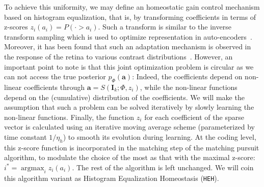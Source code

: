 \documentclass[draft]{article} %
\DeclareMathOperator*{\ArgMax}{\arg\max}   %
\newcommand{\coef}{\mathbf{a}} %
\newcommand{\image}{\mathbf{I}} %
\newcommand{\dico}{\Phi} %
\begin{document}
To achieve this uniformity, we may define an homeostatic gain control mechanism based on histogram equalization, that is, by transforming coefficients in terms of z-scores $z_i(a_i) = P( \cdot > a_i)$. Such a transform is similar to the inverse transform sampling which is used to optimize representation in auto-encoders~\citep{Doersch2016}.
Moreover, it has been found that such an adaptation mechanism is observed in the response of the retina to various contrast distributions~\citep{Laughlin81}. However, an important point to note is that this joint optimization problem is circular as we can not access the true posterior $p_\dico(\coef)$: Indeed, the coefficients depend on non-linear coefficients through $\coef = S(\image_k; \dico, z_i)$, while the non-linear functions depend on the (cumulative) distribution of the coefficients.
We will make the assumption that such a problem can be solved iteratively by slowly learning the non-linear functions.
Finally, the function $z_i$ for each coefficient of the sparse vector is calculated using an iterative moving average scheme (parameterized by time constant $1/\eta_h$) to smooth its evolution during learning. At the coding level, this z-score function is incorporated in the matching step of the matching pursuit algorithm, to modulate the choice of the most as that with the maximal z-score: $i^\ast = \ArgMax_i z_i(a_i)$. The rest of the algorithm is left unchanged.
We will coin this algorithm variant as Histogram Equalization Homeostasis (\texttt{HEH}).
\end{document}
